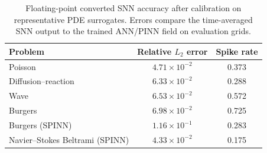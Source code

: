 \begin{table}[t]
  \centering
  \caption{Floating-point converted SNN accuracy after calibration on representative PDE surrogates. Errors compare the time-averaged SNN output to the trained ANN/PINN field on evaluation grids.}
  \label{tab:conversion:accuracy}
  \begin{tabular}{lcc}
    \toprule
    Problem & Relative $L_2$ error & Spike rate \\
    \midrule
    Poisson & $4.71\times 10^{-2}$ & 0.373 \\
    Diffusion--reaction & $6.33\times 10^{-2}$ & 0.288 \\
    Wave & $6.53\times 10^{-2}$ & 0.572 \\
    Burgers & $6.98\times 10^{-2}$ & 0.725 \\
    Burgers (SPINN) & $1.16\times 10^{-1}$ & 0.283 \\
    Navier--Stokes Beltrami (SPINN) & $4.33\times 10^{-2}$ & 0.175 \\
    \bottomrule
  \end{tabular}
\end{table}
